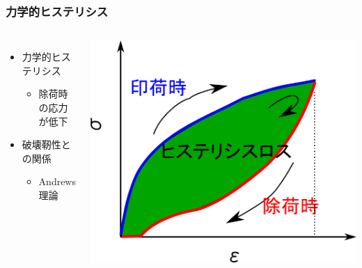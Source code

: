 \documentclass[12pt, dvipdfmx]{beamer}
\begin{document}
\begin{frame}
    \frametitle{力学的ヒステリシス}

    \begin{columns}[totalwidth=1\textwidth]
        \begin{itemize}
            \item 力学的ヒステリシス
            \begin{itemize}
                \item
                除荷時の応力が低下
            \end{itemize}
            \item 破壊靭性との関係
            \begin{itemize}
                \item
                Andrews 理論
            \end{itemize}
        \end{itemize}
        \centering
        \includegraphics[width=\textwidth]{hysteresis_curve.png}
    \end{columns}
\end{frame}
\end{document}
